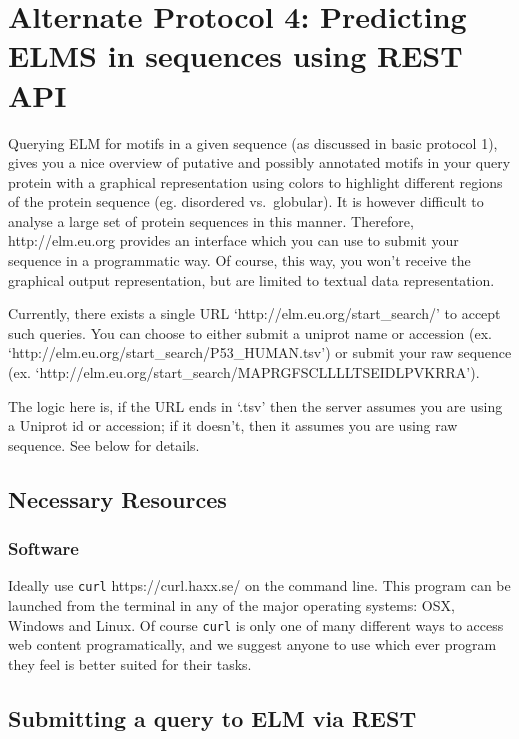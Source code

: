 \section{Alternate Protocol 4: Predicting ELMS in sequences using REST
API}\label{alternate-protocol-4-predicting-elms-in-sequences-using-rest-api}

Querying ELM for motifs in a given sequence (as discussed in basic
protocol 1), gives you a nice overview of putative and possibly
annotated motifs in your query protein with a graphical representation
using colors to highlight different regions of the protein sequence (eg.
disordered vs.~globular). It is however difficult to analyse a large set
of protein sequences in this manner. Therefore, http://elm.eu.org
provides an interface which you can use to submit your sequence in a
programmatic way. Of course, this way, you won't receive the graphical
output representation, but are limited to textual data representation.

Currently, there exists a single URL `http://elm.eu.org/start\_search/'
to accept such queries. You can choose to either submit a uniprot name
or accession (ex. `http://elm.eu.org/start\_search/P53\_HUMAN.tsv') or
submit your raw sequence (ex.
`http://elm.eu.org/start\_search/MAPRGFSCLLLLTSEIDLPVKRRA').

The logic here is, if the URL ends in `.tsv' then the server assumes you
are using a Uniprot id or accession; if it doesn't, then it assumes you
are using raw sequence. See below for details.

\subsection{Necessary Resources}\label{necessary-resources-2}

\subsubsection{Software}\label{software}

Ideally use \texttt{curl} https://curl.haxx.se/ on the command line.
This program can be launched from the terminal in any of the major
operating systems: OSX, Windows and Linux. Of course \texttt{curl} is
only one of many different ways to access web content programatically,
and we suggest anyone to use which ever program they feel is better
suited for their tasks.

\subsection{Submitting a query to ELM via
REST}\label{submitting-a-query-to-elm-via-rest}

